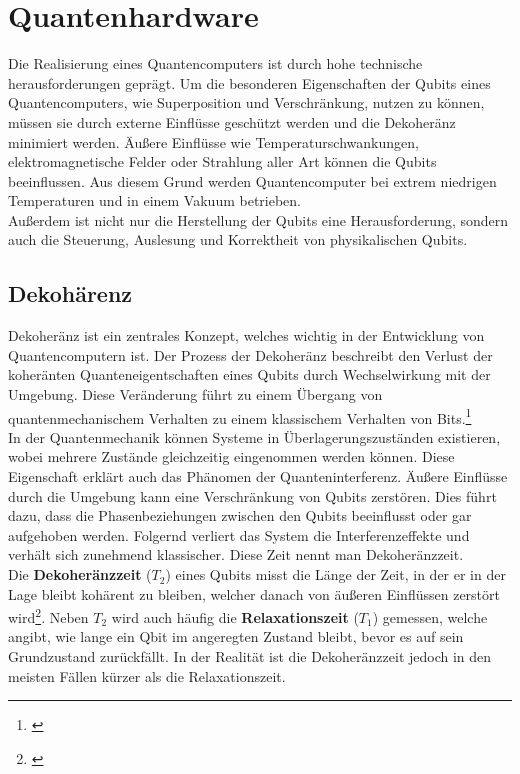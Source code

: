 \section{Quantenhardware}
\label{sec:quantenhardware}

Die Realisierung eines Quantencomputers ist durch hohe technische herausforderungen geprägt. Um die besonderen Eigenschaften der Qubits eines Quantencomputers, wie Superposition und Verschränkung, nutzen zu können, müssen sie durch externe Einflüsse geschützt werden und die Dekoheränz minimiert werden.
Äußere Einflüsse wie Temperaturschwankungen, elektromagnetische Felder oder Strahlung aller Art können die Qubits beeinflussen. Aus diesem Grund werden Quantencomputer bei extrem niedrigen Temperaturen und in einem Vakuum betrieben.\\

Außerdem ist nicht nur die Herstellung der Qubits eine Herausforderung, sondern auch die Steuerung, Auslesung und Korrektheit von physikalischen Qubits.

\subsection{Dekohärenz}
\label{sub:dekohaerenz}
Dekoheränz ist ein zentrales Konzept, welches wichtig in der Entwicklung von Quantencomputern ist. Der Prozess der Dekoheränz beschreibt den Verlust der koheränten Quanteneigentschaften eines Qubits durch Wechselwirkung mit der Umgebung.
Diese Veränderung führt zu einem Übergang von quantenmechanischem Verhalten zu einem klassischem Verhalten von Bits.\footnote{\cite{breuer_decoherence_2007}}\\

In der Quantenmechanik können Systeme in Überlagerungszuständen existieren, wobei mehrere Zustände gleichzeitig eingenommen werden können. Diese Eigenschaft erklärt auch das Phänomen der Quanteninterferenz.
Äußere Einflüsse durch die Umgebung kann eine Verschränkung von Qubits zerstören. Dies führt dazu, dass die Phasenbeziehungen zwischen den Qubits beeinflusst oder gar aufgehoben werden.
Folgernd verliert das System die Interferenzeffekte und verhält sich zunehmend klassischer. Diese Zeit nennt man Dekoheränzzeit.\\

Die \textbf{Dekoheränzzeit} ($T_2$) eines Qubits misst die Länge der Zeit, in der er in der Lage bleibt kohärent zu bleiben, welcher danach von äußeren Einflüssen zerstört wird\footnote{\cite{bacciagaluppi_role_2020}}.
Neben $T_2$ wird auch häufig die \textbf{Relaxationszeit} ($T_1$) gemessen, welche angibt, wie lange ein Qbit im angeregten Zustand bleibt, bevor es auf sein Grundzustand zurückfällt.
In der Realität ist die Dekoheränzzeit jedoch in den meisten Fällen kürzer als die Relaxationszeit.\\

